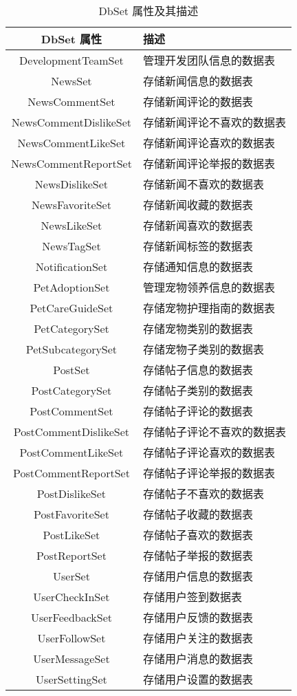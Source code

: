 \begin{itemize}
	\begin{table}[H]
		\centering
		\renewcommand\arraystretch{1.5}
		\begin{tabular}{|c|>{\raggedright\arraybackslash}p{10cm}|}
			\hline
			\textbf{DbSet 属性} & \textbf{描述} \\ \hline
			DevelopmentTeamSet & 管理开发团队信息的数据表 \\ \hline
			NewsSet & 存储新闻信息的数据表 \\ \hline
			NewsCommentSet & 存储新闻评论的数据表 \\ \hline
			NewsCommentDislikeSet & 存储新闻评论不喜欢的数据表 \\ \hline
			NewsCommentLikeSet & 存储新闻评论喜欢的数据表 \\ \hline
			NewsCommentReportSet & 存储新闻评论举报的数据表 \\ \hline
			NewsDislikeSet & 存储新闻不喜欢的数据表 \\ \hline
			NewsFavoriteSet & 存储新闻收藏的数据表 \\ \hline
			NewsLikeSet & 存储新闻喜欢的数据表 \\ \hline
			NewsTagSet & 存储新闻标签的数据表 \\ \hline
			NotificationSet & 存储通知信息的数据表 \\ \hline
			PetAdoptionSet & 管理宠物领养信息的数据表 \\ \hline
			PetCareGuideSet & 存储宠物护理指南的数据表 \\ \hline
			PetCategorySet & 存储宠物类别的数据表 \\ \hline
			PetSubcategorySet & 存储宠物子类别的数据表 \\ \hline
			PostSet & 存储帖子信息的数据表 \\ \hline
			PostCategorySet & 存储帖子类别的数据表 \\ \hline
			PostCommentSet & 存储帖子评论的数据表 \\ \hline
			PostCommentDislikeSet & 存储帖子评论不喜欢的数据表 \\ \hline
			PostCommentLikeSet & 存储帖子评论喜欢的数据表 \\ \hline
			PostCommentReportSet & 存储帖子评论举报的数据表 \\ \hline
			PostDislikeSet & 存储帖子不喜欢的数据表 \\ \hline
			PostFavoriteSet & 存储帖子收藏的数据表 \\ \hline
			PostLikeSet & 存储帖子喜欢的数据表 \\ \hline
			PostReportSet & 存储帖子举报的数据表 \\ \hline
			UserSet & 存储用户信息的数据表 \\ \hline
			UserCheckInSet & 存储用户签到数据表 \\ \hline
			UserFeedbackSet & 存储用户反馈的数据表 \\ \hline
			UserFollowSet & 存储用户关注的数据表 \\ \hline
			UserMessageSet & 存储用户消息的数据表 \\ \hline
			UserSettingSet & 存储用户设置的数据表 \\ \hline
		\end{tabular}
		\caption{DbSet 属性及其描述}
	\end{table}
	

\end{itemize}
